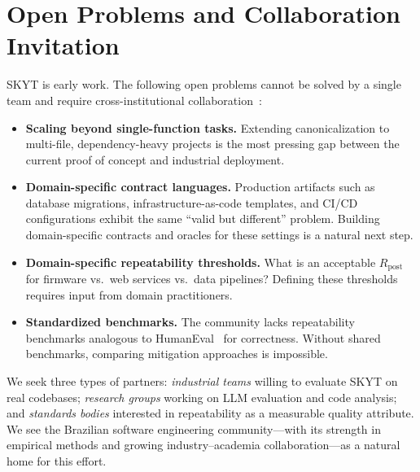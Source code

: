 \documentclass[sigconf]{acmart}
\begin{document}
\section{Open Problems and Collaboration Invitation}
\label{sec:open}

SKYT is early work.  The following open problems cannot be solved by a single team and require cross-institutional collaboration~\cite{fan2023large}:

\begin{itemize}
  \item \textbf{Scaling beyond single-function tasks.}  Extending canonicalization to multi-file, dependency-heavy projects is the most pressing gap between the current proof of concept and industrial deployment.
  
  \item \textbf{Domain-specific contract languages.}  Production artifacts such as database migrations, infrastructure-as-code templates, and CI/CD configurations exhibit the same ``valid but different'' problem.  Building domain-specific contracts and oracles for these settings is a natural next step.
  
  \item \textbf{Domain-specific repeatability thresholds.}  What is an acceptable $R_{\text{post}}$ for firmware vs.\ web services vs.\ data pipelines?  Defining these thresholds requires input from domain practitioners.
  
  \item \textbf{Standardized benchmarks.}  The community lacks repeatability benchmarks analogous to HumanEval~\cite{chen2021evaluating} for correctness.  Without shared benchmarks, comparing mitigation approaches is impossible.
\end{itemize}

We seek three types of partners: \emph{industrial teams} willing to evaluate SKYT on real codebases; \emph{research groups} working on LLM evaluation and code analysis; and \emph{standards bodies} interested in repeatability as a measurable quality attribute.  We see the Brazilian software engineering community---with its strength in empirical methods and growing industry--academia collaboration---as a natural home for this effort.

\end{document}
